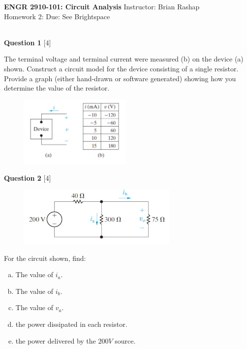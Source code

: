 \documentclass[12pt]{article}
\begin{document}
\begin{center}
\hfil
{\large\bf {ENGR 2910-101: Circuit Analysis}}
\hfill Instructor: Brian Rashap\\
Homework 2:  \hfill Due: See Brightspace\\
\hrulefill\\
\end{center}

{\bf Question 1} [4] %

The terminal voltage and terminal current were measured (b) on the device (a) shown. Construct a circuit model for the device consisting of a single resistor. Provide a graph (either hand-drawn or software generated) showing how you determine the value of the resistor. 

\begin{figure}[h!]
\centering 
\includegraphics[clip,width=0.49\textwidth]{P2-14.png}
\end{figure}

{\bf Question 2} [4] %

\begin{figure}[h!]
  \centering 
 \vspace{-0.1in}
 \includegraphics[clip,width=0.7\textwidth]{Fig2-18.png}
\vspace{-0.1in}
\end{figure}

For the circuit shown, find: 
\begin{enumerate}[(a)]
\item The value of $i_a$.
\item The value of $i_b$.
\item The value of $v_a$.
\item the power dissipated in each resistor.
\item the power delivered by the $200V$ source.
\end{enumerate}
\end{document}

